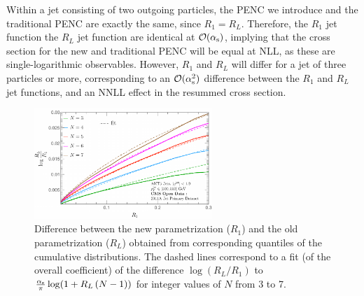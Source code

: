 Within a jet consisting of two outgoing particles, the PENC we introduce and the traditional PENC are exactly the same, since \(R_1 = R_L\).
%
Therefore, the \(R_1\) jet function the \(R_L\) jet function are identical at \(\mathcal{O}(\alpha_{\mathrm{s}})\),
implying that the cross section for the new and traditional PENC will be equal at NLL, as these are single-logarithmic observables.
%
However, \(R_1\) and \(R_L\) will differ for a jet of three particles or more, corresponding to an ${\cal O}(\alpha_{\mathrm{s}}^2)$ difference between the \(R_1\) and \(R_L\) jet functions, and an NNLL effect in the resummed cross section.


\begin{figure}[h]
    \centering
    	\includegraphics[width=0.6\textwidth]{figures/eec-angles/ENC_quantiles.pdf}
        \caption[
        Comparison of new and traditional projected energy correlators via quantiles of the corresponding cumulative distributions.
        Figure by Ankita Budhraja.
    ]{
        Difference between the new parametrization ($R_1$) and the old parametrization ($R_L$) obtained from corresponding quantiles of the cumulative distributions.
        The dashed lines correspond to a fit (of the overall coefficient) of the difference \( \log(R_L/R_1) \) to $\frac{\alpha_{\mathrm{s}}}{\pi} \log(1+R_L\,(N-1))$ for integer values of $N$ from 3 to 7.
    }
	\label{fig:nll_equiv}%
\end{figure}


